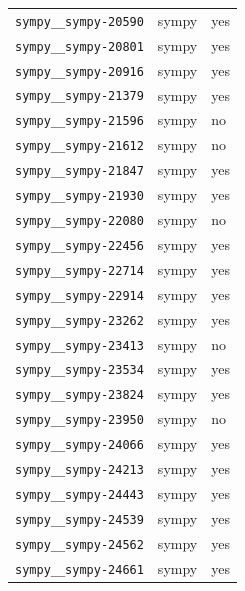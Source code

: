 \begin{longtable}{@{}p{}lp{}@{}}
\texttt{sympy\_\_sympy-20590} & sympy & yes \\
\texttt{sympy\_\_sympy-20801} & sympy & yes \\
\texttt{sympy\_\_sympy-20916} & sympy & yes \\
\texttt{sympy\_\_sympy-21379} & sympy & yes \\
\texttt{sympy\_\_sympy-21596} & sympy & no \\
\texttt{sympy\_\_sympy-21612} & sympy & no \\
\texttt{sympy\_\_sympy-21847} & sympy & yes \\
\texttt{sympy\_\_sympy-21930} & sympy & yes \\
\texttt{sympy\_\_sympy-22080} & sympy & no \\
\texttt{sympy\_\_sympy-22456} & sympy & yes \\
\texttt{sympy\_\_sympy-22714} & sympy & yes \\
\texttt{sympy\_\_sympy-22914} & sympy & yes \\
\texttt{sympy\_\_sympy-23262} & sympy & yes \\
\texttt{sympy\_\_sympy-23413} & sympy & no \\
\texttt{sympy\_\_sympy-23534} & sympy & yes \\
\texttt{sympy\_\_sympy-23824} & sympy & yes \\
\texttt{sympy\_\_sympy-23950} & sympy & no \\
\texttt{sympy\_\_sympy-24066} & sympy & yes \\
\texttt{sympy\_\_sympy-24213} & sympy & yes \\
\texttt{sympy\_\_sympy-24443} & sympy & yes \\
\texttt{sympy\_\_sympy-24539} & sympy & yes \\
\texttt{sympy\_\_sympy-24562} & sympy & yes \\
\texttt{sympy\_\_sympy-24661} & sympy & yes \\
\end{longtable}
